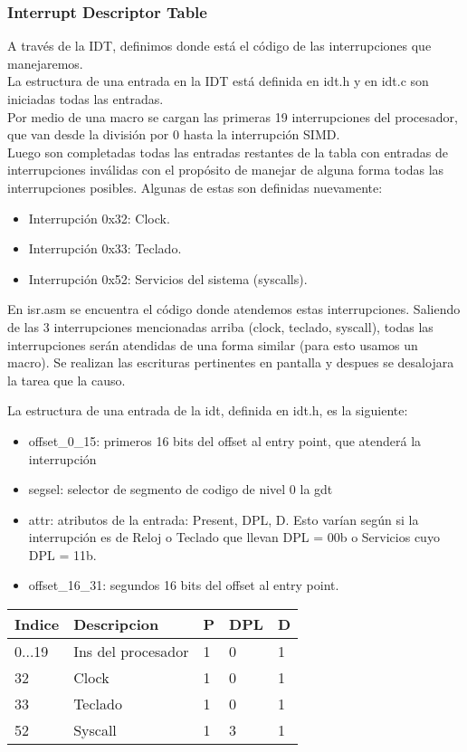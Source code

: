 \subsubsection{Interrupt Descriptor Table}
A trav\'es de la IDT, definimos donde est\'a el c\'odigo de las interrupciones que manejaremos.\\
La estructura de una entrada en la IDT est\'a definida en idt.h y en idt.c son iniciadas todas las entradas.\\
Por medio de una macro se cargan las primeras 19 interrupciones del procesador, que van desde la divisi\'on por 0 hasta la interrupci\'on SIMD.\\
Luego son completadas todas las entradas restantes de la tabla con entradas de interrupciones inv\'alidas con el prop\'osito de manejar 
de alguna forma todas las interrupciones posibles. Algunas de estas son definidas nuevamente:\\
\begin{itemize}
 \item Interrupci\'on 0x32: Clock.
 \item Interrupci\'on 0x33: Teclado.
 \item Interrupci\'on 0x52: Servicios del sistema (syscalls).
\end{itemize}

En isr.asm se encuentra el c\'odigo donde atendemos estas interrupciones. Saliendo de las 3 interrupciones mencionadas arriba (clock, teclado, syscall),
todas las interrupciones serán atendidas de una forma similar (para esto usamos un macro). Se realizan las escrituras pertinentes en pantalla y despues se desalojara la 
tarea que la causo.

La estructura de una entrada de la idt, definida en idt.h, es la siguiente:\\
\begin{itemize}
 \item offset\_0\_15: primeros 16 bits del offset al entry point, que atender\'a la interrupci\'on
 \item segsel: selector de segmento de codigo de nivel 0 la gdt
 \item attr: atributos de la entrada: Present, DPL, D. Esto var\'ian seg\'un si la interrupci\'on es de Reloj o Teclado que llevan DPL = 00b
o Servicios cuyo DPL = 11b.
 \item offset\_16\_31: segundos 16 bits del offset al entry point.
\end{itemize}


\begin{tabular}{l l l l l}
Indice & Descripcion & P & DPL & D\\

\hline
0...19 & Ins del procesador & 1 & 0 & 1 \\
32 & Clock & 1 & 0 & 1\\
33 & Teclado	 & 1 & 0 & 1\\
52 & Syscall & 1 & 3 & 1\\
\end{tabular}

